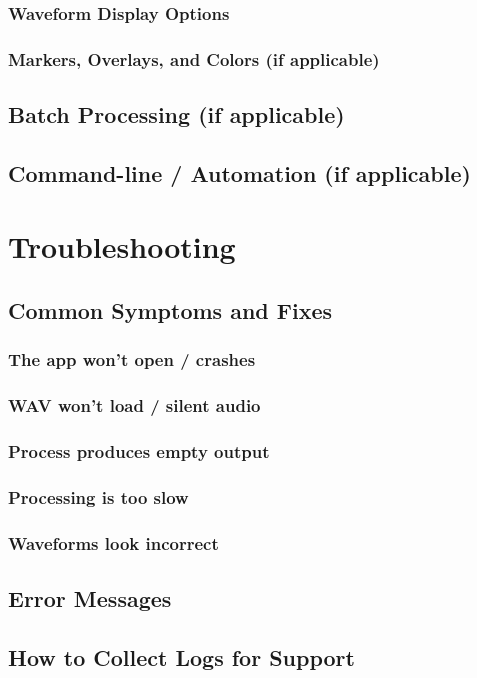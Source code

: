 \documentclass[11pt]{report}
\begin{document}
    \subsection{Waveform Display Options}
    \subsection{Markers, Overlays, and Colors (if applicable)}
    \section{Batch Processing (if applicable)}
    \section{Command-line / Automation (if applicable)}
    
    \chapter{Troubleshooting}
    \section{Common Symptoms and Fixes}
    \subsection{The app won’t open / crashes}
    \subsection{WAV won’t load / silent audio}
    \subsection{Process produces empty output}
    \subsection{Processing is too slow}
    \subsection{Waveforms look incorrect}
    \section{Error Messages}
    \section{How to Collect Logs for Support}
    
\end{document}
